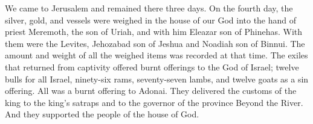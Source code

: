 \begin{biblechapter}
\verse We came to Jerusalem and remained there three days.
\verse On the fourth day, the silver, gold, and vessels were weighed in the house of our God into the hand of priest Meremoth, the son of Uriah, and with him Eleazar son of Phinehas. With them were the Levites, Jehozabad son of Jeshua and Noadiah son of Binnui.
\verse The amount and weight of all the weighed items was recorded at that time.
\verse The exiles that returned from captivity offered burnt offerings to the God of Israel; twelve bulls for all Israel, ninety-six rams, seventy-seven lambs, and twelve goats as a sin offering. All was a burnt offering to Adonai.
\verse They delivered the customs of the king to the king’s satraps and to the governor of the province Beyond the River. And they supported the people of the house of God.
\end{biblechapter}


